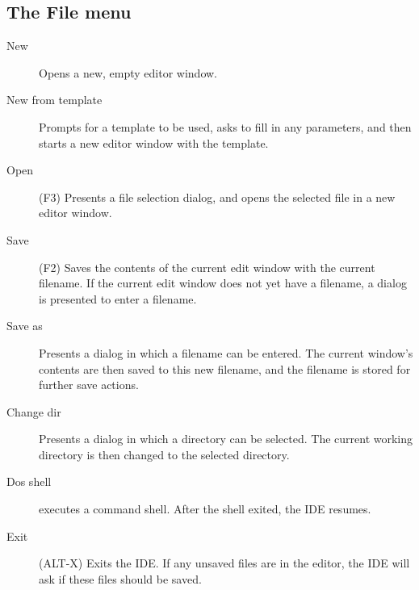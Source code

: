 \subsection{The File menu}
\label{se:menufile}
\begin{description}
\item[New] Opens a new, empty editor window. 
\item[New from template] Prompts for a template to be used, asks to fill in
any parameters, and then starts a new editor window with the template.
\item[Open] (\textsc{F3}) Presents a file selection dialog, and opens 
the selected file in a new editor window. 
\item[Save] (\textsc{F2}) Saves the contents of the current edit window 
with the current filename. If the current edit window does not yet have
a filename, a dialog is presented to enter a filename.
\item[Save as] Presents a dialog in which a filename can be entered. The
current window's contents are then saved to this new filename, and the
filename is stored for further save actions.
\item[Change dir] Presents a dialog in which a directory can be selected.
The current working directory is then changed to the selected directory.
\item[Dos shell] executes a command shell. After the shell exited, the
IDE resumes.
\item[Exit] (\textsc{ALT-X}) Exits the IDE. If any unsaved files are 
in the editor, the IDE will ask if these files should be saved.
\end{description}
%
%
